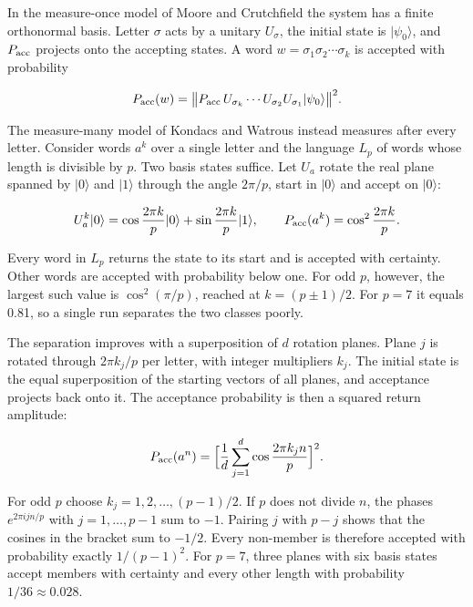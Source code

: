 \documentclass[11pt,oneside]{book}
\newenvironment{centeredalign}{\[\begin{gathered}[c]}{\end{gathered}\]}
\begin{document}
In the measure-once model of Moore and Crutchfield the system has a finite orthonormal basis. Letter \(\sigma\) acts by a unitary \(U_\sigma\), the initial state is \(|\psi_0\rangle\), and \(P_{\rm acc}\) projects onto the accepting states. A word \(w=\sigma_1\sigma_2\cdots\sigma_k\) is accepted with probability

\begin{centeredalign}
P_{\rm acc}(w)=\big\|P_{\rm acc}\,U_{\sigma_k}\cdots U_{\sigma_2}U_{\sigma_1}|\psi_0\rangle\big\|^2.
\end{centeredalign}

The measure-many model of Kondacs and Watrous instead measures after every letter. Consider words \(a^k\) over a single letter and the language \(L_p\) of words whose length is divisible by \(p\). Two basis states suffice. Let \(U_a\) rotate the real plane spanned by \(|0\rangle\) and \(|1\rangle\) through the angle \(2\pi/p\), start in \(|0\rangle\) and accept on \(|0\rangle\):

\begin{centeredalign}
U_a^k|0\rangle=\cos\frac{2\pi k}{p}|0\rangle+\sin\frac{2\pi k}{p}|1\rangle,\qquad
P_{\rm acc}(a^k)=\cos^2\frac{2\pi k}{p}.
\end{centeredalign}

Every word in \(L_p\) returns the state to its start and is accepted with certainty. Other words are accepted with probability below one. For odd \(p\), however, the largest such value is \(\cos^2(\pi/p)\), reached at \(k=(p\pm1)/2\). For \(p=7\) it equals 0.81, so a single run separates the two classes poorly.

The separation improves with a superposition of \(d\) rotation planes. Plane \(j\) is rotated through \(2\pi k_j/p\) per letter, with integer multipliers \(k_j\). The initial state is the equal superposition of the starting vectors of all planes, and acceptance projects back onto it. The acceptance probability is then a squared return amplitude:

\begin{centeredalign}
P_{\rm acc}(a^n)=\Big[\frac1d\sum_{j=1}^{d}\cos\frac{2\pi k_jn}{p}\Big]^2.
\end{centeredalign}

For odd \(p\) choose \(k_j=1,2,\ldots,(p-1)/2\). If \(p\) does not divide \(n\), the phases \(e^{2\pi ijn/p}\) with \(j=1,\ldots,p-1\) sum to \(-1\). Pairing \(j\) with \(p-j\) shows that the cosines in the bracket sum to \(-1/2\). Every non-member is therefore accepted with probability exactly \(1/(p-1)^2\). For \(p=7\), three planes with six basis states accept members with certainty and every other length with probability \(1/36\approx0.028\).
\end{document}
